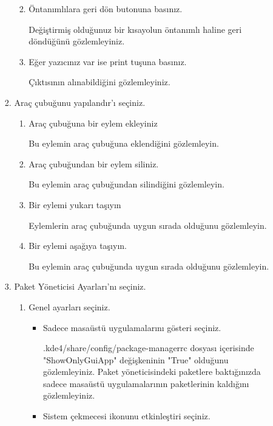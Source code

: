 \documentclass[a4paper,10pt]{article}
\begin{document}
\begin{enumerate}
\begin{enumerate}
\begin{enumerate}
\begin{enumerate}
\begin{itemize}
                \end{itemize}
		\item Öntanımlılara geri dön butonuna basınız.
      
		 Değiştirmiş olduğunuz bir kısayolun öntanımlı haline geri döndüğünü gözlemleyiniz.

		\item Eğer yazıcınız var ise print tuşuna basınız.
	  
		Çıktısının alınabildiğini gözlemleyiniz.
            \end{enumerate}
            \item Araç çubuğunu yapılandır'ı seçiniz.
            \begin{enumerate}
                \item Araç çubuğuna bir eylem ekleyiniz
		 
		Bu eylemin araç çubuğuna eklendiğini gözlemleyin.

                \item Araç çubuğundan bir eylem siliniz.
      
		Bu eylemin araç çubuğundan silindiğini gözlemleyin.

                \item Bir eylemi yukarı taşıyın
      
		Eylemlerin araç çubuğunda uygun sırada olduğunu gözlemleyin.
                \item Bir eylemi aşağıya taşıyın.

                Bu eylemin araç çubuğunda uygun sırada olduğunu gözlemleyin.
            \end{enumerate}
            \item Paket Yöneticisi Ayarları'nı seçiniz.
            \begin{enumerate}
                \item Genel ayarları seçiniz.
                \begin{itemize}
                    \item Sadece masaüstü uygulamalarını gösteri seçiniz.

                    .kde4/share/config/package-managerrc dosyası içerisinde "ShowOnlyGuiApp" değişkeninin "True" olduğunu gözlemleyiniz.
		     Paket yöneticisindeki paketlere baktığınızda sadece masaüstü uygulamalarının paketlerinin kaldığını gözlemleyiniz.

                    \item Sistem çekmecesi ikonunu etkinleştiri seçiniz.


\end{itemize}
\end{enumerate}
\end{enumerate}
\end{enumerate}
\end{enumerate}
\end{document}
